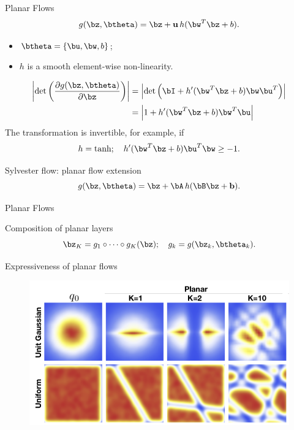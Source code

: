\begin{frame}{Planar Flows}
	\vspace{-0.2cm}
	\[
	g(\bz, \btheta) = \bz + \mathbf{u} \, h(\bw^T\bz + b).
	\]
	\vspace{-0.2cm}
	\begin{itemize}
		\item $\btheta = \{\bu, \bw, b\}$;
		\item $h$ is a smooth element-wise non-linearity.
	\end{itemize}
	\begin{align*}
		\left| \det \left( \frac{\partial g(\bz, \btheta)}{\partial \bz} \right)\right| &= \left| \det \left( \bI +  h'(\bw^T \bz + b) \bw\bu^T\right) \right| \\
		&= \left| 1 + h'(\bw^T \bz + b) \bw^T \bu \right|
	\end{align*}
	The transformation is invertible, for example, if
	\[
	h = \tanh; \quad h'(\bw^T \bz + b) \bu^T \bw \geq -1.
	\]
	\vspace{-0.3cm}
	\begin{block}{Sylvester flow: planar flow extension}
	\vspace{-0.3cm}
		\[
			g(\bz, \btheta) = \bz + \bA \, h(\bB\bz + \mathbf{b}).
		\]
	\end{block}
\end{frame}
\begin{frame}{Planar Flows}
	\begin{block}{Composition of planar layers}
	\[
		\bz_K = g_1 \circ \dots \circ g_K (\bz); \quad g_k = g(\bz_k, \btheta_k).
	\]
	\end{block}
	\begin{block}{Expressiveness of planar flows}
	\begin{figure}
		\centering
		\includegraphics[width=0.8\linewidth]{figs/planar_flows.png}
	\end{figure}
	\end{block}
\end{frame}
